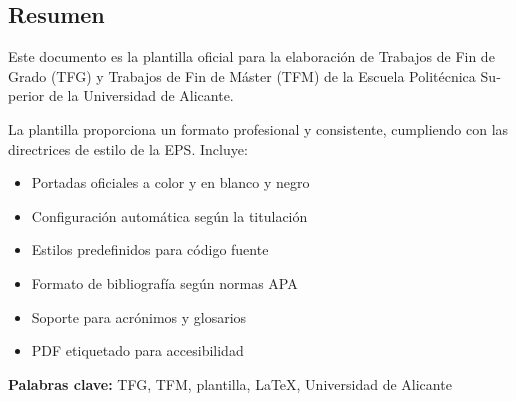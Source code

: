 \begin{otherlanguage}{spanish}
\chapter*{Resumen}

Este documento es la plantilla oficial para la elaboración de Trabajos de Fin de Grado (TFG) y Trabajos de Fin de Máster (TFM) de la Escuela Politécnica Superior de la Universidad de Alicante.

La plantilla proporciona un formato profesional y consistente, cumpliendo con las directrices de estilo de la EPS. Incluye:

\begin{itemize}
  \item Portadas oficiales a color y en blanco y negro
  \item Configuración automática según la titulación
  \item Estilos predefinidos para código fuente
  \item Formato de bibliografía según normas APA
  \item Soporte para acrónimos y glosarios
  \item PDF etiquetado para accesibilidad
\end{itemize}

\textbf{Palabras clave:} TFG, TFM, plantilla, LaTeX, Universidad de Alicante

\end{otherlanguage}

\cleardoublepage

